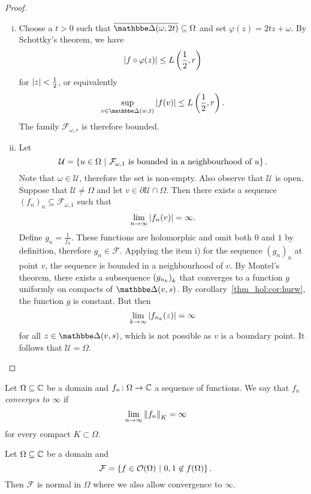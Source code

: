 \begin{proof}
\phantom{a}
\begin{enumerate}[i)]
\item Choose a $t > 0$ such that
$\oline{\dsk(\omega, 2t)} \subseteq \Omega$ and set
$\varphi(z) = 2tz + \omega$. By Schottky's theorem, we have
\[
\left\lvert f \circ \varphi(z)\right\rvert \leq L \left(\frac{1}{2}, r\right)
\]
for $\left\lvert z\right\rvert < \frac{1}{2}$, or equivalently
\[
\sup_{v \in \dsk(w, t)} \abs{f(v)} \leq L \br{\frac{1}{2}, r}.
\]
The family $\mathcal{F}_{\omega, r}$ is therefore bounded.

\item Let
\[
\mathcal{U} =
\left\{u \in \Omega~\middle\vert~\text{$\mathcal{F}_{\omega, 1}$ is bounded in a neighbourhood of
$u$}\right\}.
\]
Note that $\omega \in \mathcal{U}$, therefore the set is non-empty.
Also observe that $\mathcal{U}$ is open. Suppose that
$\mathcal{U} \ne \Omega$ and let
$v \in \partial \mathcal{U} \cap \Omega$. Then there exists a
sequence
$(f_n)_n \subseteq \mathcal{F}_{\omega, 1}$ such that
\[
\lim_{n \to \infty} \left\lvert f_n(v)\right\rvert = \infty.
\]
Define $g_n = \frac{1}{f_n}$. These functions are holomorphic and
omit both $0$ and $1$ by definition, therefore
$g_n \in \mathcal{F}$. Applying the item i) for the sequence
$(g_n)_n$ at point $v$, the sequence is bounded in a neighbourhood
of $v$. By Montel's theorem, there exists a subsequence
$\left(g_{n_k}\right)_k$ that converges to a function $g$ uniformly on
compacts of $\dsk(v, s)$. By corollary~\ref{thm_hol:cor:hurw},
the function $g$ is constant. But then
\[
\lim_{k \to \infty} \left\lvert f_{n_k}(z)\right\rvert = \infty
\]
for all $z \in \dsk(v, s)$, which is not possible as $v$ is a
boundary point. It follows that $\mathcal{U} = \Omega$. \qedhere
\end{enumerate}
\end{proof}

\begin{definicija}
Let $\Omega \subseteq \mathbb{C}$ be a domain and
$f_n \colon \Omega \to \mathbb{C}$ a sequence of functions. We say that
$f_n$ \emph{converges to $\infty$}
if
\[
\lim_{n \to \infty} \left\lVert f_n\right\rVert_K = \infty
\]
for every compact $K \subset \Omega$.
\end{definicija}

\begin{izrek}
Let $\Omega \subseteq \mathbb{C}$ be a domain and
\[
\mathcal{F} =
\left\{f \in \mathcal{O}(\Omega)~\middle\vert~0, 1 \not \in f(\Omega)\right\}.
\]
Then $\mathcal{F}$ is normal in $\Omega$ where we also allow
convergence to $\infty$.
\end{izrek}

